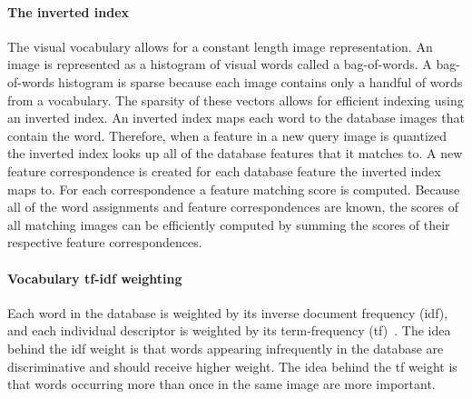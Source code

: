 
        \paragraph{The inverted index}
            The visual vocabulary allows for a constant length image
              representation.
            An image is represented as a histogram of visual words
              called a bag-of-words.
            A bag-of-words histogram is sparse because each image
              contains only a handful of words from a vocabulary.
            The sparsity of these vectors allows for efficient indexing
              using an inverted index.
            An inverted index maps each word to the database images
              that contain the word.
            Therefore, when a feature in a new query image is quantized
              the inverted index looks up all of the database features
              that it matches to.
            A new feature correspondence is created for each database
              feature the inverted index maps to.
            For each correspondence a feature matching score is
              computed.
            Because all of the word assignments and feature
              correspondences are known, the scores of all matching
              images can be efficiently computed by summing the scores of
              their respective feature correspondences.


        \paragraph{Vocabulary tf-idf weighting}
            Each word in the database is weighted by its inverse
              document frequency (idf), and each individual descriptor is
              weighted by its term-frequency
              (tf)~\cite{sivic_efficient_2009}.
            The idea behind the idf weight is that words appearing
              infrequently in the database are discriminative and should
              receive higher weight.
            The idea behind the tf weight is that words occurring more
              than once in the same image are more important.

